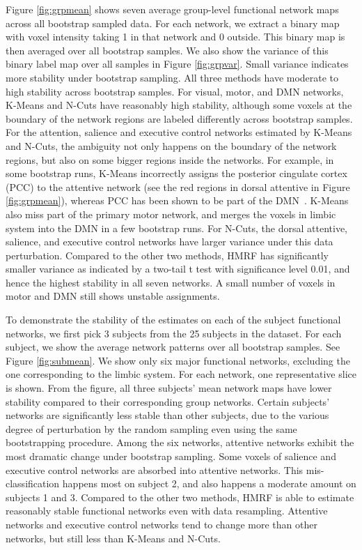 \documentclass[review,authoryear]{elsarticle}
\begin{document}
Figure \ref{fig:grpmean} shows seven average group-level functional network maps
across all bootstrap sampled data. For each network, we extract a binary map
with voxel intensity taking 1 in that network and 0 outside. This binary map is
then averaged over all bootstrap samples. We also show the variance of this
binary label map over all samples in Figure \ref{fig:grpvar}. Small variance
indicates more stability under bootstrap sampling.  All three methods have
moderate to high stability across bootstrap samples. For visual, motor, and DMN
networks, K-Means and N-Cuts have reasonably high stability, although some
voxels at the boundary of the network regions are labeled differently across
bootstrap samples. For the attention, salience and executive control networks
estimated by K-Means and N-Cuts, the ambiguity not only happens on the boundary
of the network regions, but also on some bigger regions inside the networks. For
example, in some bootstrap runs, K-Means incorrectly assigns the posterior
cingulate cortex (PCC) to the attentive network (see the red regions in dorsal
attentive in Figure \ref{fig:grpmean}), whereas PCC has been shown to be part of
the DMN~\citep{greicius2003functional}. K-Means also miss part of the primary
motor network, and merges the voxels in limbic system into the DMN in a few
bootstrap runs. For N-Cuts, the dorsal attentive, salience, and executive
control networks have larger variance under this data perturbation. Compared to
the other two methods, HMRF has significantly smaller variance as indicated by a
two-tail t test with significance level 0.01, and hence the highest stability
in all seven networks. A small number of voxels in motor and DMN still shows
unstable assignments.

To demonstrate the stability of the estimates on each of the subject functional
networks, we first pick 3 subjects from the 25 subjects in the dataset. For each
subject, we show the average network patterns over all bootstrap samples. See
Figure \ref{fig:submean}. We show only six major functional networks, excluding
the one corresponding to the limbic system. For each network, one representative
slice is shown. From the figure, all three subjects' mean network maps have
lower stability compared to their corresponding group networks. Certain
subjects' networks are significantly less stable than other subjects, due to the
various degree of perturbation by the random sampling even using the same
bootstrapping procedure. Among the six networks, attentive networks exhibit the
most dramatic change under bootstrap sampling. Some voxels of salience and
executive control networks are absorbed into attentive networks. This
mis-classification happens most on subject 2, and also happens a moderate amount
on subjects 1 and 3. Compared to the other two methods, HMRF is able to estimate
reasonably stable functional networks even with data resampling. Attentive
networks and executive control networks tend to change more than other networks,
but still less than K-Means and N-Cuts.
\end{document}

